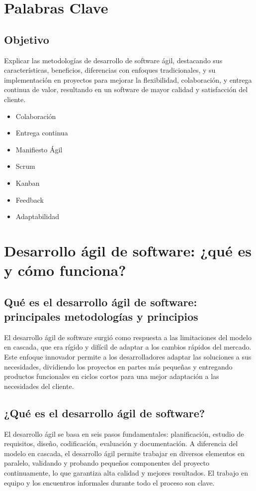 \documentclass{article}
\begin{document}
\section{Palabras Clave}
\subsection{Objetivo}
Explicar las metodologías de desarrollo de software ágil, destacando sus características, beneficios, diferencias con enfoques tradicionales, y su implementación en proyectos para mejorar la flexibilidad, colaboración, y entrega continua de valor, resultando en un software de mayor calidad y satisfacción del cliente.
\begin{itemize}
    \item Colaboración
    \item Entrega continua
    \item Manifiesto Ágil
    \item Scrum
    \item Kanban
    \item Feedback
    \item Adaptabilidad
\end{itemize}

\section{Desarrollo ágil de software: ¿qué es y cómo funciona?}
\onehalfspacing
\subsection{Qué es el desarrollo ágil de software: principales metodologías y principios}
El desarrollo ágil de software surgió como respuesta a las limitaciones del modelo en cascada, que era rígido y difícil de adaptar a los cambios rápidos del mercado. Este enfoque innovador permite a los desarrolladores adaptar las soluciones a sus necesidades, dividiendo los proyectos en partes más pequeñas y entregando productos funcionales en ciclos cortos para una mejor adaptación a las necesidades del cliente.

\subsection{¿Qué es el desarrollo ágil de software?}
El desarrollo ágil se basa en seis pasos fundamentales: planificación, estudio de requisitos, diseño, codificación, evaluación y documentación. A diferencia del modelo en cascada, el desarrollo ágil permite trabajar en diversos elementos en paralelo, validando y probando pequeños componentes del proyecto continuamente, lo que garantiza alta calidad y mejores resultados. El trabajo en equipo y los encuentros informales durante todo el proceso son clave.
\end{document}
